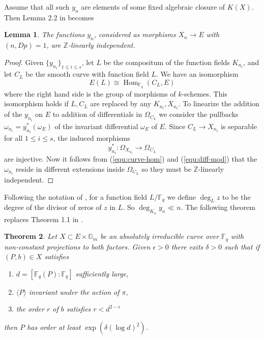 \documentclass[12pt]{article}
\theoremstyle{plain}
\newtheorem{theorem}{Theorem}
\newtheorem{lemma}[theorem]{Lemma}
\theoremstyle{definition}
\newcommand{\ang}[1]{\langle#1\rangle}
\DeclareMathOperator{\Hom}{Hom}
\def\Z{\ensuremath{\mathbb{Z}}}
\def\F{\ensuremath{\mathbb{F}}}
\begin{document}
Assume that all such $y_n$ are elements of some fixed algebraic closure of $K(X)$. Then Lemma 2.2 
in \cite{voloch2010} becomes
\begin{lemma}
	The functions $y_n$, considered as morphisms $X_n \rightarrow E$ with $(n, Dp) = 1$, are 
	$\Z$-linearly independent.
\end{lemma}
\begin{proof}
	Given $\{y_{n_i}\}_{1 \le i \le s}$, let $L$ be the compositum of the function fields $K_{n_i}$,
	and let $C_L$ be the smooth curve with function field $L$. We have an isomorphism 
	\begin{equation}
	\label{equ:curve-hom}
		E(L) \cong \Hom_{\F_q}(C_L, E)
	\end{equation}
	where the right hand side is the group of morphisms of $k$-schemes. This isomorphism holds if 
	$L, C_L$ are replaced by any $K_{n_i}, X_{n_i}$. To linearize the addition of the $y_{n_i}$ on 
	$E$ to addition of differentials in $\Omega_{C_L}$ we consider the pullbacks $\omega_{n_i} = 
	y_{n_i}^*(\omega_E)$ of the invariant differential $\omega_E$ of $E$. Since $C_L \rightarrow 
	X_{n_i}$ is separable for all $1 \le i \le s$, the induced morphisms
	\begin{equation}
	\label{equ:diff-mod}
	y_{n_i}^*: \Omega_{X_{n_i}} \longrightarrow \Omega_{C_L}
	\end{equation}
	are injective. Now it follows from (\ref{equ:curve-hom}) and (\ref{equ:diff-mod}) that the 
	$\omega_{n_i}$ reside in different extensions inside $\Omega_{C_L}$ so they must be 
	$\Z$-linearly independent.
\end{proof}
Following the notation of \cite{voloch2010}, for a function field $L/\F_q$ we define $\deg_Lz$ to 
be the degree of the divisor of zeros of $z$ in $L$. So $\deg_{K_n}y_n \ll n$. The following 
theorem replaces Theorem 1.1 in \cite{voloch2010}.
\begin{theorem}
	\label{theo:order-general}
	Let $X \subset E \times \mathbb{G}_m$ be an absolutely irreducible curve over $\F_q$ with 
	non-constant projections to both factors. Given $\epsilon > 0$ there exits $\delta > 0$ such 
	that if $(P, b) \in X$ satisfies
	\begin{enumerate}[leftmargin = *, labelsep = *, align = left, itemsep = -0.1cm, font = 
	\normalfont, label = (\roman*)]
		\item $d = [\F_q(P) : \F_q]$ sufficiently large,
		\item $\ang{P}$ invariant under the action of $\pi$,
		\item the order $r$ of $b$ satisfies $r < d^{2 - \epsilon}$
	\end{enumerate}
	then $P$ has order at least $\exp(\delta (\log d)^2)$.
\end{theorem}
\end{document}
